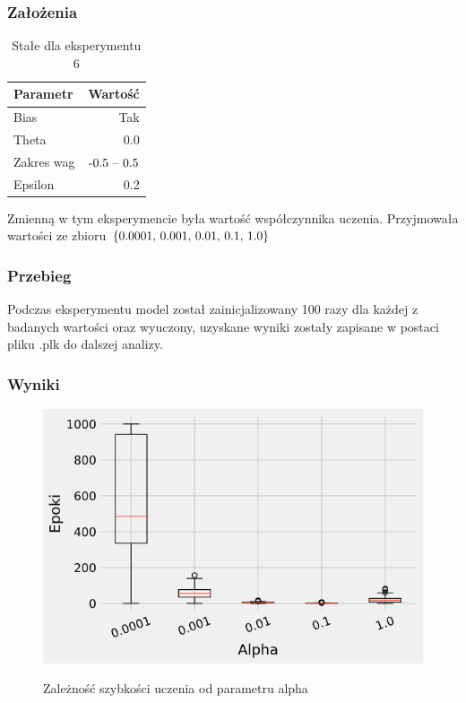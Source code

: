 \documentclass{article}
\begin{document}
\subsubsection*{Założenia}

\begin{table}[!h]
	\caption{Stałe dla eksperymentu 6}
	\label{tabela-const-6}
	\centering
	\begin{tabular}{lr}
		\toprule
		Parametr   & Wartość         \\
		\midrule
		Bias       & Tak               \\
		Theta      & 0.0               \\
		Zakres wag & \($-0.5 -- 0.5$\) \\
		Epsilon    & 0.2               \\
		\bottomrule
	\end{tabular}
\end{table}

Zmienną w tym eksperymencie była wartość współczynnika uczenia. Przyjmowała wartości ze zbioru \(\{$0.0001, 0.001, 0.01, 0.1, 1.0$\}\)

\subsubsection*{Przebieg}

Podczas eksperymentu model został zainicjalizowany 100 razy dla każdej z badanych wartości oraz wyuczony, uzyskane wyniki zostały zapisane w postaci pliku .plk do dalszej analizy.

\subsubsection*{Wyniki}

\begin{figure}[!h]
	\centering
	\caption{Zależność szybkości uczenia od parametru alpha}
	\includegraphics[width=.5\textwidth]{ada_alpha.png}
	\label{fig:res6}
\end{figure}
\end{document}
